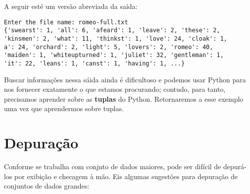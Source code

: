 A seguir esté um versão abreviada da saída:

\beforeverb
\begin{verbatim}
Enter the file name: romeo-full.txt
{'swearst': 1, 'all': 6, 'afeard': 1, 'leave': 2, 'these': 2,
'kinsmen': 2, 'what': 11, 'thinkst': 1, 'love': 24, 'cloak': 1,
a': 24, 'orchard': 2, 'light': 5, 'lovers': 2, 'romeo': 40,
'maiden': 1, 'whiteupturned': 1, 'juliet': 32, 'gentleman': 1,
'it': 22, 'leans': 1, 'canst': 1, 'having': 1, ...}
\end{verbatim}
\afterverb
%
Buscar informações nessa sáida ainda é dificultoso e podemos usar Python para nos fornecer exatamente o que estamos procurando; contudo, para tanto, precisamos aprender sobre as {\bf tuplas} do Python. Retornaremos a esse exemplo uma vez que aprendermos sobre tuplas.

\section{Depuração}

Conforme se trabalha com conjnto de dados maiores, pode ser difícil de depurá-los por exibição e checagem à mão. Eis algumas sugestões para depuração de conjuntos de dados grandes:

